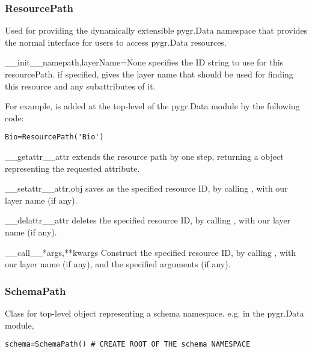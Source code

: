 \documentclass{howto}
\begin{document}
\subsubsection{ResourcePath}
Used for providing the dynamically extensible pygr.Data namespace
that provides the normal interface for users to access pygr.Data resources.
\begin{funcdesc}{__init__}{namepath,layerName=None}
   specifies the ID string to use for this resourcePath.
   if specified, gives the layer name that should be used
  for finding this resource and any subattributes of it.

  For example,  is added at the top-level of the pygr.Data module
  by the following code:
\begin{verbatim}
Bio=ResourcePath('Bio')
\end{verbatim}
\end{funcdesc}

\begin{funcdesc}{__getattr__}{attr}
  extends the resource path by one step, returning a
   object representing the requested attribute.
\end{funcdesc}

\begin{funcdesc}{__setattr__}{attr,obj}
  saves  as the specified resource ID, by calling
  , with our layer name (if any).
\end{funcdesc}

\begin{funcdesc}{__delattr__}{attr}
  deletes the specified resource ID, by calling
  , with our layer name (if any).
\end{funcdesc}

\begin{funcdesc}{__call__}{*args,**kwargs}
  Construct the specified resource ID, by calling ,
  with our layer name (if any), and the specified arguments (if any).
\end{funcdesc}

\subsubsection{SchemaPath}
Class for top-level object representing a schema namespace.  e.g. in the pygr.Data
module,
\begin{verbatim}
schema=SchemaPath() # CREATE ROOT OF THE schema NAMESPACE
\end{verbatim}
\end{document}
